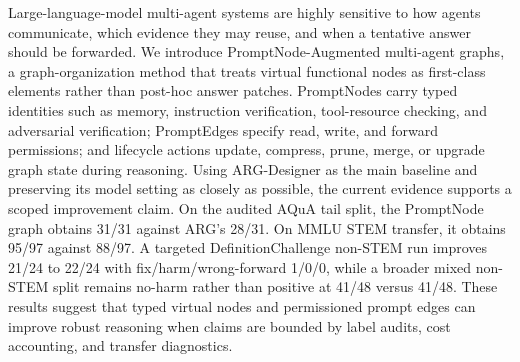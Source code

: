 Large-language-model multi-agent systems are highly sensitive to how agents communicate, which evidence they may reuse, and when a tentative answer should be forwarded. We introduce PromptNode-Augmented multi-agent graphs, a graph-organization method that treats virtual functional nodes as first-class elements rather than post-hoc answer patches. PromptNodes carry typed identities such as memory, instruction verification, tool-resource checking, and adversarial verification; PromptEdges specify read, write, and forward permissions; and lifecycle actions update, compress, prune, merge, or upgrade graph state during reasoning. Using ARG-Designer as the main baseline and preserving its model setting as closely as possible, the current evidence supports a scoped improvement claim. On the audited AQuA tail split, the PromptNode graph obtains 31/31 against ARG's 28/31. On MMLU STEM transfer, it obtains 95/97 against 88/97. A targeted DefinitionChallenge non-STEM run improves 21/24 to 22/24 with fix/harm/wrong-forward 1/0/0, while a broader mixed non-STEM split remains no-harm rather than positive at 41/48 versus 41/48. These results suggest that typed virtual nodes and permissioned prompt edges can improve robust reasoning when claims are bounded by label audits, cost accounting, and transfer diagnostics.
